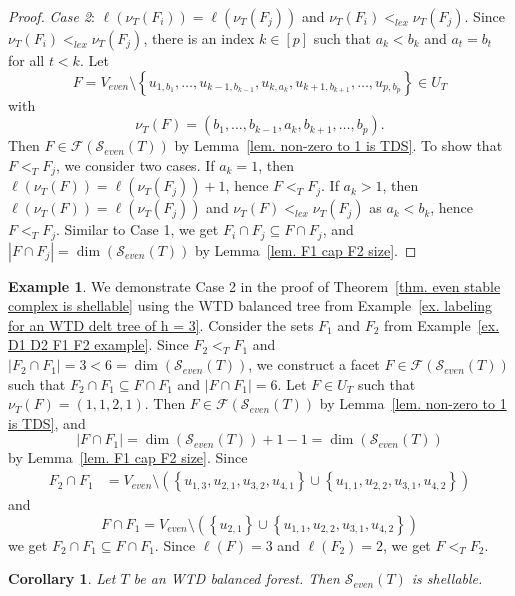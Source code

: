 \documentclass[12pt, reqno]{amsart}
\theoremstyle{definition}
\theoremstyle{plain}
\newtheorem{corollary}[theorem]{Corollary}
\theoremstyle{definition}
\newtheorem{example}[theorem]{Example}
\newcommand\set[1]{\left\lbrace #1 \right\rbrace}
\newcommand{\calS}{\mathcal{S}}
\begin{document}
\begin{proof}
    \noindent\emph{Case 2}: $\ell(\nu_T(F_i)) = \ell(\nu_T(F_j))$ and $\nu_T(F_i) <_{lex} \nu_T(F_j)$.
    Since $\nu_T(F_i) <_{lex} \nu_T(F_j)$, there is an index $k \in [p]$ such that $a_k < b_k$ and $a_t = b_t$ for all $t < k$.
    Let 
    $$
    F = V_{even} \setminus \set{u_{1,b_1},\dots,u_{k-1,b_{k-1}}, u_{k,a_k}, u_{k+1,b_{k+1}},\dots,u_{p,b_p}} \in U_T 
    $$ 
    with
    $$
    \nu_T(F) = (b_1,\dots,b_{k-1},a_{k},b_{k+1},\dots,b_p).
    $$
    Then $F \in \mathcal{F}(\calS_{even}(T))$ by Lemma~\ref{lem. non-zero to 1 is TDS}.
    To show that $F <_T F_j$, we consider two cases.
    If $a_k = 1$, then $\ell(\nu_T(F)) = \ell(\nu_T(F_j)) + 1$, hence $F <_T F_j$.
    If $a_k > 1$, then $\ell(\nu_T(F)) = \ell(\nu_T(F_j))$ and $\nu_T(F) <_{lex} \nu_T(F_j)$ as $a_k < b_k$, hence $F <_T F_j$.
    Similar to Case 1, we get $F_i \cap F_j \subseteq F \cap F_j$, and $|F \cap F_j| = \dim(\calS_{even}(T))$ by Lemma~\ref{lem. F1 cap F2 size}.
\end{proof}

\begin{example}
    We demonstrate Case 2 in the proof of Theorem~\ref{thm. even stable complex is shellable} using the WTD balanced tree from Example~\ref{ex. labeling for an WTD delt tree of h = 3}.
    Consider the sets $F_1$ and $F_2$ from Example~\ref{ex. D1 D2 F1 F2 example}.
    Since $F_2 <_T F_1$ and $|F_2 \cap F_1| = 3 < 6 = \dim(\calS_{even}(T))$, we construct a facet $F \in \mathcal{F}(\calS_{even}(T))$ such that $F_2 \cap F_1 \subseteq F \cap F_1$ and $|F\cap F_1| = 6$.
    Let $F \in U_T $ such that $\nu_T(F) = (1,1,2,1)$.
    Then $F \in \mathcal{F}(\calS_{even}(T))$ by Lemma~\ref{lem. non-zero to 1 is TDS}, and 
    $$
    |F \cap F_1| = \dim(\calS_{even}(T)) + 1 - 1 = \dim(\calS_{even}(T))
    $$
    by Lemma~\ref{lem. F1 cap F2 size}.
    Since 
    \begin{align*}
    F_2 \cap F_1 &= V_{even}\setminus \left(\set{u_{1,3},u_{2,1},u_{3,2},u_{4,1}} \cup \set{u_{1,1},u_{2,2},u_{3,1},u_{4,2}} \right)
    \end{align*}
    and
    $$
    F \cap F_1 = V_{even} \setminus \left(\set{u_{2,1}} \cup \set{u_{1,1},u_{2,2},u_{3,1},u_{4,2}} \right)
    $$
    we get $F_2 \cap F_1 \subseteq F \cap F_1$.
    Since $\ell(F) = 3$ and $\ell(F_2) = 2$, we get $F <_T F_2$.
\end{example}

\begin{corollary}\label{cor. even stable complex of delta forest is shellable}
    Let $T$ be an WTD balanced forest.
    Then $\calS_{even}(T)$ is shellable.
\end{corollary}
\end{document}
